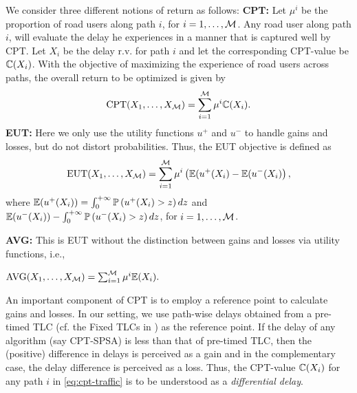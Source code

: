 We consider three different notions of return as follows:
%
\textbf{CPT:} Let $\mu^i$ be the proportion of road users along path $i$, for $i=1,\ldots,\mathcal{M}$. Any road user along path $i$, will evaluate the delay he experiences in a manner that is captured well by CPT. Let $X_i$ be the delay r.v. for path $i$ and let the corresponding CPT-value be $\mathbb{C}(X_i)$. With the objective of maximizing the experience of road users across paths, the overall return to be optimized is given by
\begin{align}
\text{CPT}(X_1,\ldots,X_{\mathcal{M}}) = \sum_{i=1}^{\mathcal{M}} \mu^i \mathbb{C}(X_i).\label{eq:cpt-traffic}
\end{align}
\textbf{EUT:} Here we only use the utility functions $u^+$ and $u^-$ to handle gains and losses, but do not distort probabilities. 
Thus, the EUT objective is defined as
\begin{align*}
\text{EUT}(X_1,\ldots,X_{\mathcal{M}}) = \sum_{i=1}^{\mathcal{M}} \mu^i \left(\mathbb{E}(u^+(X_i) - \mathbb{E}(u^-(X_i)\right),
\end{align*}
where $\mathbb{E}(u^+(X_i)) = \int_0^{+\infty} \mathbb{P}\left( u^+(X_i)>z \right) dz$ and $\mathbb{E}(u^-(X_i)) - \int_0^{+\infty} \mathbb{P}\left( u^-(X_i)>z \right) dz$, for $i=1,\ldots,\mathcal{M}$.

\textbf{AVG:} This is EUT without the distinction between gains and losses via utility functions, i.e.,\\[1ex] 
\centerline{$\text{AVG}(X_1,\ldots,X_{\mathcal{M}}) = \sum_{i=1}^{\mathcal{M}} \mu^i \mathbb{E}(X_i).$} 

An important component of CPT is to employ a reference point to calculate gains and losses. 
In our setting, we use path-wise delays obtained from a pre-timed TLC (cf. the Fixed TLCs in \cite{prashanth2011reinforcement}) as the reference point. If the delay of any algorithm (say CPT-SPSA) is less than that of pre-timed TLC, then the (positive) difference in delays is perceived as a gain and in the complementary case, the delay difference is perceived as a loss. Thus, the CPT-value $\mathbb{C}(X_i)$ for any path $i$ in \eqref{eq:cpt-traffic} is to be understood as a \textit{differential delay}.  


